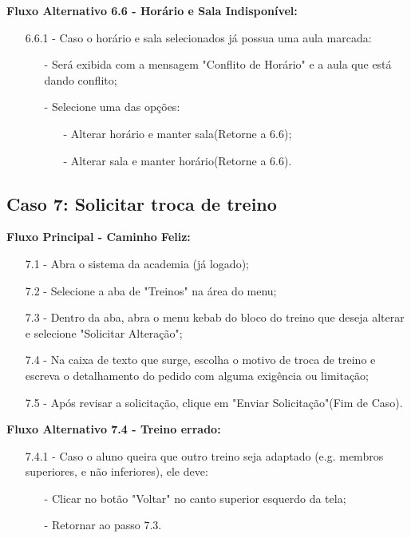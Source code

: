 \documentclass{article}
\begin{document}
    \textbf{Fluxo Alternativo 6.6 - Horário e Sala Indisponível:}

    \begin{itemize}
        \item[6.6.1 -] Caso o horário  e sala selecionados já possua uma aula marcada:
        \begin{itemize}
            \item[-] Será exibida com a mensagem "Conflito de Horário" e a aula que está dando conflito;
            \item[-] Selecione uma das opções:
            \begin{itemize}
                \item[-] Alterar horário e manter sala(Retorne a 6.6);
                \item[-] Alterar sala e manter horário(Retorne a 6.6).
            \end{itemize}
        \end{itemize}
    \end{itemize}
    
\subsection{Caso 7: Solicitar troca de treino}

    \textbf{Fluxo Principal - Caminho Feliz:}

    \begin{itemize}
        \item[7.1 -] Abra o sistema da academia (já logado);
        \item[7.2 -] Selecione a aba de "Treinos" na área do menu;
        \item[7.3 -] Dentro da aba, abra o menu kebab do bloco do treino que deseja alterar e selecione "Solicitar Alteração";
        \item[7.4 -] Na caixa de texto que surge, escolha o motivo de troca de treino e escreva o detalhamento do pedido com alguma exigência ou limitação;
        \item[7.5 -] Após revisar a solicitação, clique em "Enviar Solicitação"(Fim de Caso).
    \end{itemize}
    
    \textbf{Fluxo Alternativo 7.4 - Treino errado:}

    \begin{itemize}
        \item[7.4.1 -] Caso o aluno queira que outro treino seja adaptado (e.g. membros superiores, e não inferiores), ele deve:
        \begin{itemize}
            \item[-] Clicar no botão "Voltar" no canto superior esquerdo da tela;
            \item[-] Retornar ao passo 7.3.
        \end{itemize}
    \end{itemize}
\end{document}
